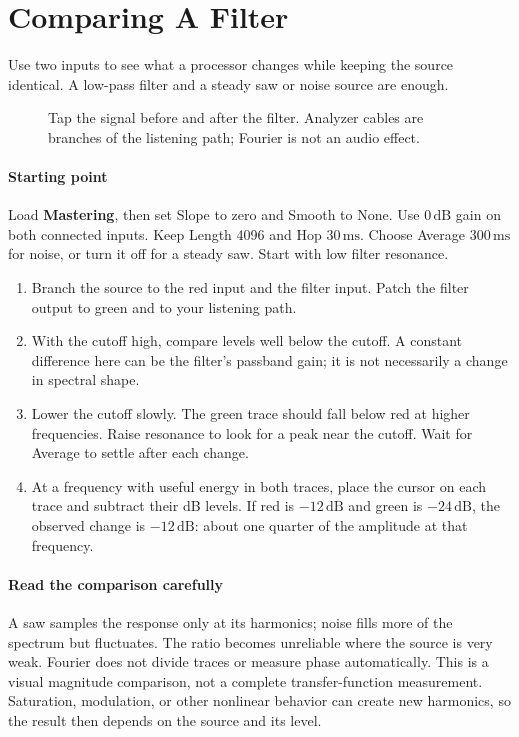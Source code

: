 \section{Comparing A Filter}\label{sec:filter}

Use two inputs to see what a processor changes while keeping the source
identical. A low-pass filter and a steady saw or noise source are enough.

\begin{figure}[!htp]
\centering

\caption{Tap the signal before and after the filter. Analyzer cables are
branches of the listening path; Fourier is not an audio effect.}
\end{figure}

\paragraph{Starting point}
Load \textbf{Mastering}, then set Slope to zero and Smooth to None. Use
$0\,\mathrm{dB}$ gain on both connected inputs. Keep Length 4096 and
Hop $30\,\mathrm{ms}$. Choose Average $300\,\mathrm{ms}$ for noise, or
turn it off for a steady saw. Start with low filter resonance.

\begin{enumerate}
  \item Branch the source to the red input and the filter input. Patch
  the filter output to green and to your listening path.
  \item With the cutoff high, compare levels well below the cutoff. A
  constant difference here can be the filter's passband gain; it is not
  necessarily a change in spectral shape.
  \item Lower the cutoff slowly. The green trace should fall below red at
  higher frequencies. Raise resonance to look for a peak near the cutoff.
  Wait for Average to settle after each change.
  \item At a frequency with useful energy in both traces, place the cursor
  on each trace and subtract their dB levels. If red is $-12\,\mathrm{dB}$
  and green is $-24\,\mathrm{dB}$, the observed change is $-12\,\mathrm{dB}$:
  about one quarter of the amplitude at that frequency.
\end{enumerate}

\paragraph{Read the comparison carefully}
A saw samples the response only at its harmonics; noise fills more of the
spectrum but fluctuates. The ratio becomes unreliable where the source is
very weak. Fourier does not divide traces or measure phase automatically.
This is a visual magnitude comparison, not a complete transfer-function
measurement. Saturation, modulation, or other nonlinear behavior can create
new harmonics, so the result then depends on the source and its level.


